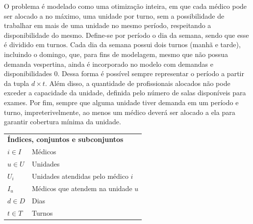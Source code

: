 O problema é modelado como uma otimização inteira, em que cada médico pode ser alocado a no máximo, uma unidade por turno, sem a possibilidade de trabalhar em mais de uma unidade no mesmo período, respeitando a disponibilidade do mesmo.  Define-se por período o  $\mbox{dia}$ da semana, sendo que esse é dividido em  $\mbox{turnos}$. Cada dia da semana possui dois turnos (manhã e tarde), incluindo o domingo, que, para fins de modelagem, mesmo que não possua demanda vespertina, ainda é incorporado no modelo com demandas e disponibilidades $0$. Dessa forma é possível sempre representar o período a partir da tupla $d \times t$. Além disso, a quantidade de profissionais alocados não pode exceder a capacidade da unidade, definida pelo número de salas disponíveis para exames. Por fim, sempre que alguma unidade tiver demanda em um período e turno, impreterivelmente, ao menos um médico deverá ser alocado a ela para garantir cobertura mínima da unidade.

\newpage

\begin{small}
	\begin{tabular}{ll}
		\multicolumn{2}{l}{\textbf{Índices, conjuntos e subconjuntos}} \\
		$i \in I$       \quad & Médicos                                \\
		$u \in U$       \quad & Unidades                               \\
		$U_i$           \quad & Unidades atendidas pelo médico $i$     \\
		$I_u$           \quad & Médicos que atendem na unidade $u$     \\
		$d \in D$       \quad & Dias                                   \\
		$t \in T$       \quad & Turnos                                 \\
	\end{tabular}
\end{small}



